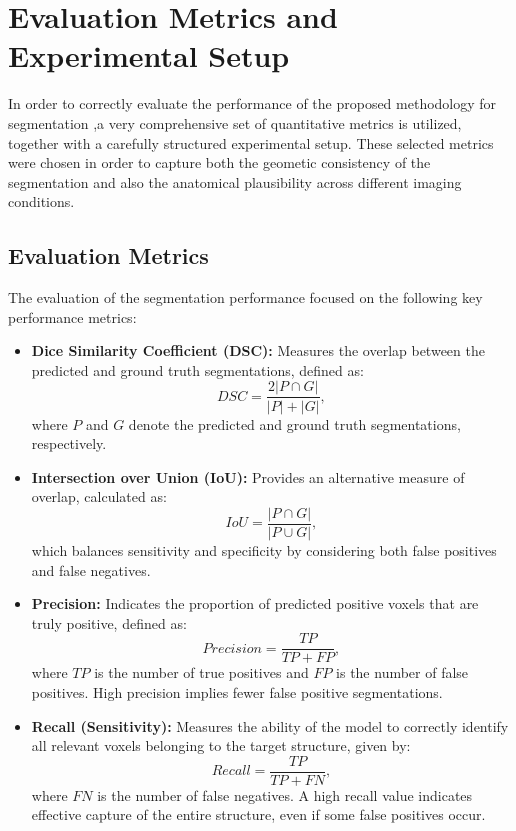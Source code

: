 \section{Evaluation Metrics and Experimental Setup}
In order to correctly evaluate the performance of the proposed methodology for segmentation ,a very comprehensive set of quantitative metrics is utilized, together with a carefully structured experimental setup. These selected metrics were chosen in order to capture both the geometic consistency of the segmentation and also the anatomical plausibility across different imaging conditions.

\subsection{Evaluation Metrics}
The evaluation of the segmentation performance focused on the following key performance metrics:

\begin{itemize}
    \item \textbf{Dice Similarity Coefficient (DSC):} Measures the overlap between the predicted and ground truth segmentations, defined as:
    \begin{equation}
    DSC = \frac{2|P \cap G|}{|P| + |G|},
    \end{equation}
    where $P$ and $G$ denote the predicted and ground truth segmentations, respectively.
    
    \item \textbf{Intersection over Union (IoU):} Provides an alternative measure of overlap, calculated as:
    \begin{equation}
    IoU = \frac{|P \cap G|}{|P \cup G|},
    \end{equation}
    which balances sensitivity and specificity by considering both false positives and false negatives.
    
    \item \textbf{Precision:} Indicates the proportion of predicted positive voxels that are truly positive, defined as:
    \begin{equation}
    Precision = \frac{TP}{TP + FP},
    \end{equation}
    where $TP$ is the number of true positives and $FP$ is the number of false positives. High precision implies fewer false positive segmentations.
    
    \item \textbf{Recall (Sensitivity):} Measures the ability of the model to correctly identify all relevant voxels belonging to the target structure, given by:
    \begin{equation}
    Recall = \frac{TP}{TP + FN},
    \end{equation}
    where $FN$ is the number of false negatives. A high recall value indicates effective capture of the entire structure, even if some false positives occur.
    \end{itemize}
    
